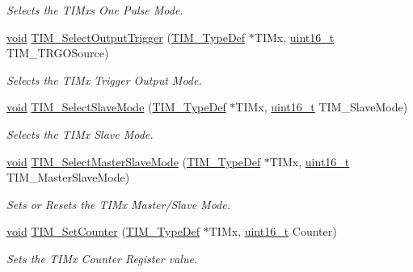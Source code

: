 \begin{DoxyCompactItemize}
\begin{DoxyCompactList}\small\item\em Selects the T\+I\+Mx\textquotesingle{}s One Pulse Mode. \end{DoxyCompactList}\item 
\hyperlink{usb__devapi_8h_afabf60e7f57651d6d595a02c75f07cd0}{void} \hyperlink{group___t_i_m___exported___functions_ga28745aaa549e2067e42c19569209e6c6}{T\+I\+M\+\_\+\+Select\+Output\+Trigger} (\hyperlink{struct_t_i_m___type_def}{T\+I\+M\+\_\+\+Type\+Def} $\ast$T\+I\+Mx, \hyperlink{_p_e___types_8h_a1f1825b69244eb3ad2c7165ddc99c956}{uint16\+\_\+t} T\+I\+M\+\_\+\+T\+R\+G\+O\+Source)
\begin{DoxyCompactList}\small\item\em Selects the T\+I\+Mx Trigger Output Mode. \end{DoxyCompactList}\item 
\hyperlink{usb__devapi_8h_afabf60e7f57651d6d595a02c75f07cd0}{void} \hyperlink{group___t_i_m___exported___functions_ga2f19ce1d90990691cf037e419ba08003}{T\+I\+M\+\_\+\+Select\+Slave\+Mode} (\hyperlink{struct_t_i_m___type_def}{T\+I\+M\+\_\+\+Type\+Def} $\ast$T\+I\+Mx, \hyperlink{_p_e___types_8h_a1f1825b69244eb3ad2c7165ddc99c956}{uint16\+\_\+t} T\+I\+M\+\_\+\+Slave\+Mode)
\begin{DoxyCompactList}\small\item\em Selects the T\+I\+Mx Slave Mode. \end{DoxyCompactList}\item 
\hyperlink{usb__devapi_8h_afabf60e7f57651d6d595a02c75f07cd0}{void} \hyperlink{group___t_i_m___exported___functions_ga4dcc3d11b670c381d0ff9cb7e9fd01e2}{T\+I\+M\+\_\+\+Select\+Master\+Slave\+Mode} (\hyperlink{struct_t_i_m___type_def}{T\+I\+M\+\_\+\+Type\+Def} $\ast$T\+I\+Mx, \hyperlink{_p_e___types_8h_a1f1825b69244eb3ad2c7165ddc99c956}{uint16\+\_\+t} T\+I\+M\+\_\+\+Master\+Slave\+Mode)
\begin{DoxyCompactList}\small\item\em Sets or Resets the T\+I\+Mx Master/\+Slave Mode. \end{DoxyCompactList}\item 
\hyperlink{usb__devapi_8h_afabf60e7f57651d6d595a02c75f07cd0}{void} \hyperlink{group___t_i_m___exported___functions_gaad2c31dc9c551b48f08b96ba49c4aa44}{T\+I\+M\+\_\+\+Set\+Counter} (\hyperlink{struct_t_i_m___type_def}{T\+I\+M\+\_\+\+Type\+Def} $\ast$T\+I\+Mx, \hyperlink{_p_e___types_8h_a1f1825b69244eb3ad2c7165ddc99c956}{uint16\+\_\+t} Counter)
\begin{DoxyCompactList}\small\item\em Sets the T\+I\+Mx Counter Register value. \end{DoxyCompactList}\item 

\end{DoxyCompactItemize}
